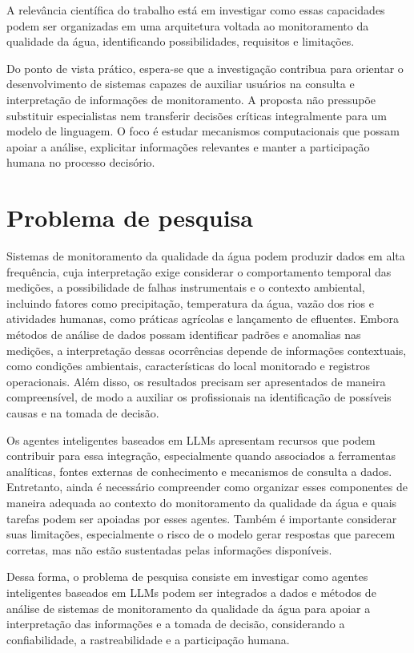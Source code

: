 A relevância científica do trabalho está em investigar como essas capacidades podem ser organizadas em uma arquitetura voltada ao monitoramento da qualidade da água, identificando possibilidades, requisitos e limitações.

Do ponto de vista prático, espera-se que a investigação contribua para orientar o desenvolvimento de sistemas capazes de auxiliar usuários na consulta e interpretação de informações de monitoramento. A proposta não pressupõe substituir especialistas nem transferir decisões críticas integralmente para um modelo de linguagem. O foco é estudar mecanismos computacionais que possam apoiar a análise, explicitar informações relevantes e manter a participação humana no processo decisório.

\section{Problema de pesquisa}
\label{sec:problema}

Sistemas de monitoramento da qualidade da água podem produzir dados em alta frequência, cuja interpretação exige considerar o comportamento temporal das medições, a possibilidade de falhas instrumentais e o contexto ambiental, incluindo fatores como precipitação, temperatura da água, vazão dos rios e atividades humanas, como práticas agrícolas e lançamento de efluentes. Embora métodos de análise de dados possam identificar padrões e anomalias nas medições, a interpretação dessas ocorrências depende de informações contextuais, como condições ambientais, características do local monitorado e registros operacionais. Além disso, os resultados precisam ser apresentados de maneira compreensível, de modo a auxiliar os profissionais na identificação de possíveis causas e na tomada de decisão.

Os agentes inteligentes baseados em LLMs apresentam recursos que podem contribuir para essa integração, especialmente quando associados a ferramentas analíticas, fontes externas de conhecimento e mecanismos de consulta a dados. Entretanto, ainda é necessário compreender como organizar esses componentes de maneira adequada ao contexto do monitoramento da qualidade da água e quais tarefas podem ser apoiadas por esses agentes. Também é importante considerar suas limitações, especialmente o risco de o modelo gerar respostas que parecem corretas, mas não estão sustentadas pelas informações disponíveis.

Dessa forma, o problema de pesquisa consiste em investigar como agentes inteligentes baseados em LLMs podem ser integrados a dados e métodos de análise de sistemas de monitoramento da qualidade da água para apoiar a interpretação das informações e a tomada de decisão, considerando a confiabilidade, a rastreabilidade e a participação humana.

